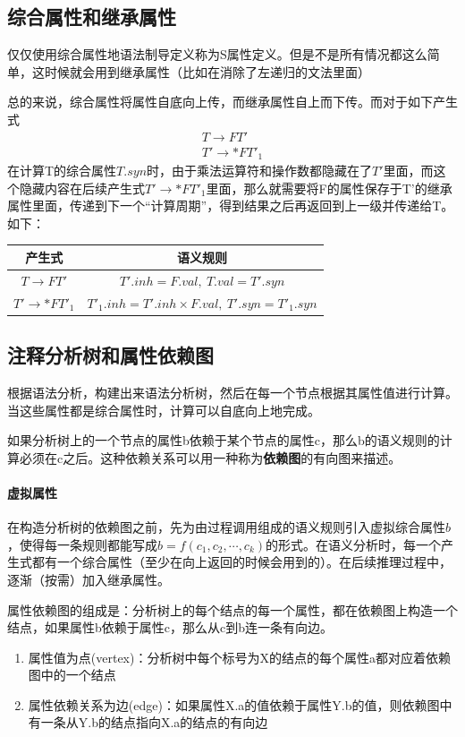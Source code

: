 \documentclass[]{report}
\begin{document}
		\subsection{综合属性和继承属性}
		仅仅使用综合属性地语法制导定义称为S属性定义。但是不是所有情况都这么简单，这时候就会用到继承属性（比如在消除了左递归的文法里面）\par
		总的来说，综合属性将属性自底向上传，而继承属性自上而下传。而对于如下产生式
		\[\begin{gathered}
			T\to FT'\\
			T'\to *FT'_1
		\end{gathered}\]
		在计算T的综合属性$T.syn$时，由于乘法运算符和操作数都隐藏在了$T'$里面，而这个隐藏内容在后续产生式$T'\to*FT'_1$里面，那么就需要将F的属性保存于T'的继承属性里面，传递到下一个“计算周期”，得到结果之后再返回到上一级并传递给T。如下：
		\begin{table}[h!]
			\centering
			\begin{tabular}{cc}
				\toprule
				产生式&语义规则\\
				\midrule
				$T\to FT'$&$T'.inh=F.val,\ T.val=T'.syn$\\
				$T'\to*FT'_1$&$T'_1.inh=T'.inh\times F.val,\ T'.syn=T'_1.syn$\\
				\bottomrule
			\end{tabular}
		\end{table}
		\subsection{注释分析树和属性依赖图}
		根据语法分析，构建出来语法分析树，然后在每一个节点根据其属性值进行计算。当这些属性都是综合属性时，计算可以自底向上地完成。\par
		如果分析树上的一个节点的属性b依赖于某个节点的属性c，那么b的语义规则的计算必须在c之后。这种依赖关系可以用一种称为\textbf{依赖图}的有向图来描述。
		\paragraph{虚拟属性}
		在构造分析树的依赖图之前，先为由过程调用组成的语义规则引入虚拟综合属性$b$，使得每一条规则都能写成$b=f(c_1,c_2,\cdots,c_k)$的形式。在语义分析时，每一个产生式都有一个综合属性（至少在向上返回的时候会用到的）。在后续推理过程中，逐渐（按需）加入继承属性。\par
		属性依赖图的组成是：分析树上的每个结点的每一个属性，都在依赖图上构造一个结点，如果属性b依赖于属性c，那么从c到b连一条有向边。
		\begin{enumerate}
			\item 属性值为点(vertex)：分析树中每个标号为X的结点的每个属性a都对应着依赖图中的一个结点
			\item 属性依赖关系为边(edge)：如果属性X.a的值依赖于属性Y.b的值，则依赖图中有一条从Y.b的结点指向X.a的结点的有向边
		\end{enumerate}
\end{document}
